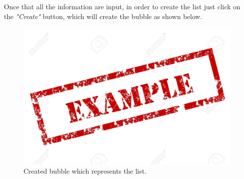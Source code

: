 Once that all the information are input, in order to create the list just click on the \textit{"Create"} button, which will create the bubble as shown below.

\begin{figure}[H]
  \centering 
  \includegraphics[width=\textwidth]{Sections/3-HowToUse/Images/example.jpeg}
  \caption{Created bubble which represents the list.}
\end{figure}